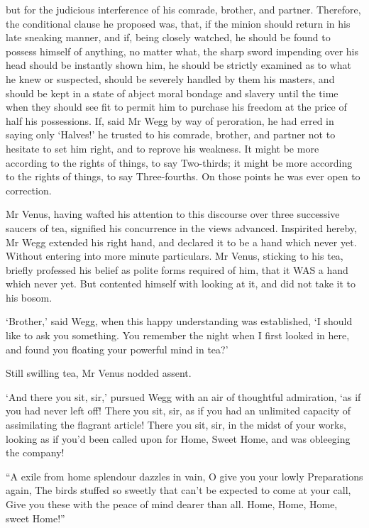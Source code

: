 but for the judicious interference of his comrade, brother, and partner.
Therefore, the conditional clause he proposed was, that, if the minion
should return in his late sneaking manner, and if, being closely
watched, he should be found to possess himself of anything, no matter
what, the sharp sword impending over his head should be instantly shown
him, he should be strictly examined as to what he knew or suspected,
should be severely handled by them his masters, and should be kept in
a state of abject moral bondage and slavery until the time when they
should see fit to permit him to purchase his freedom at the price of
half his possessions. If, said Mr Wegg by way of peroration, he had
erred in saying only ‘Halves!’ he trusted to his comrade, brother, and
partner not to hesitate to set him right, and to reprove his weakness.
It might be more according to the rights of things, to say
Two-thirds; it might be more according to the rights of things, to say
Three-fourths. On those points he was ever open to correction.

Mr Venus, having wafted his attention to this discourse over three
successive saucers of tea, signified his concurrence in the views
advanced. Inspirited hereby, Mr Wegg extended his right hand, and
declared it to be a hand which never yet. Without entering into more
minute particulars. Mr Venus, sticking to his tea, briefly professed his
belief as polite forms required of him, that it WAS a hand which never
yet. But contented himself with looking at it, and did not take it to
his bosom.

‘Brother,’ said Wegg, when this happy understanding was established, ‘I
should like to ask you something. You remember the night when I first
looked in here, and found you floating your powerful mind in tea?’

Still swilling tea, Mr Venus nodded assent.

‘And there you sit, sir,’ pursued Wegg with an air of thoughtful
admiration, ‘as if you had never left off! There you sit, sir, as if you
had an unlimited capacity of assimilating the flagrant article! There
you sit, sir, in the midst of your works, looking as if you’d been
called upon for Home, Sweet Home, and was obleeging the company!

     “A exile from home splendour dazzles in vain,
     O give you your lowly Preparations again,
     The birds stuffed so sweetly that can’t be expected to come at
     your call,
     Give you these with the peace of mind dearer than all.
     Home, Home, Home, sweet Home!”

